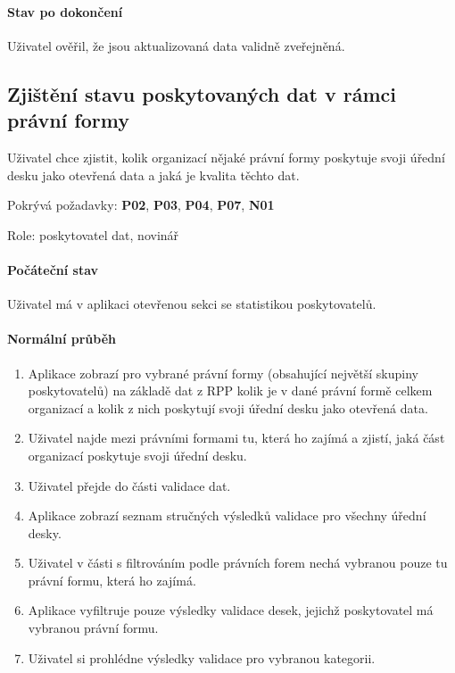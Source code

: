 \paragraph{Stav po dokončení}
Uživatel ověřil, že jsou aktualizovaná data validně zveřejněná.

\subsection{Zjištění stavu poskytovaných dat v rámci právní formy} \label{use-case:statAVal}

Uživatel chce zjistit, kolik organizací nějaké právní formy poskytuje svoji úřední desku jako otevřená data a jaká je kvalita těchto dat.

Pokrývá požadavky: \textbf{P02}, \textbf{P03}, \textbf{P04}, \textbf{P07}, \textbf{N01}  

Role: poskytovatel dat, novinář

\paragraph{Počáteční stav} 
Uživatel má v aplikaci otevřenou sekci se statistikou poskytovatelů.

\paragraph{Normální průběh}
\begin{enumerate}
    \item Aplikace zobrazí pro vybrané právní formy (obsahující největší skupiny poskytovatelů) na základě dat z RPP kolik je v dané právní formě celkem organizací a kolik z nich poskytují svoji úřední desku jako otevřená data.
    \item Uživatel najde mezi právními formami tu, která ho zajímá a zjistí, jaká část organizací poskytuje svoji úřední desku.
    \item Uživatel přejde do části validace dat.
    \item Aplikace zobrazí seznam stručných výsledků validace pro všechny úřední desky.
    \item Uživatel v části s filtrováním podle právních forem nechá vybranou pouze tu právní formu, která ho zajímá.
    \item Aplikace vyfiltruje pouze výsledky validace desek, jejichž poskytovatel má vybranou právní formu.
    \item Uživatel si prohlédne výsledky validace pro vybranou kategorii.
\end{enumerate}


